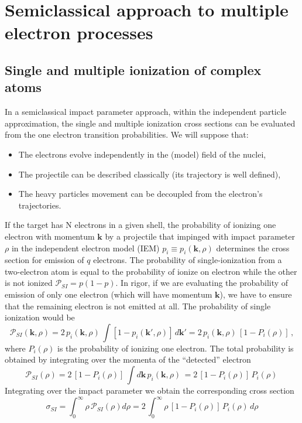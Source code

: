 \chapter{Semiclassical approach to multiple electron processes}
\label{C:Semic-appro-multi-elect-proce}

\section{Single and multiple ionization of complex atoms}
\label{S:Single-multipl-ionizat-complex-atoms}

In a semiclassical impact parameter approach, within the independent
particle approximation, the single and multiple ionization cross
sections can be evaluated from the one electron transition
probabilities. We will suppose that:
\begin{itemize}
\item The electrons evolve independently  in the (model) field of the
nuclei,
\item The projectile can be described classically (its trajectory is
well defined),
\item The  heavy particles movement can be decoupled from the electron's
  trajectories.
\end{itemize}

If the target has N electrons in a given shell, the probability of
ionizing one electron with momentum $\bm{k}$ by a projectile that
impinged with impact parameter $\rho$ in the independent electron model
(IEM) $p_{i} \equiv p_{i}(\bm{k},\rho) $ determines the cross section
for emission of $q$ electrons. The probability of single-ionization
from a two-electron atom is equal to the probability of ionize on
electron while the other is not ionized $\mathcal{P}_{SI} = p(1-p)$. In
rigor, if we are evaluating the probability of emission of only one
electron (which will have momentum $\bm{k}$), we have to ensure that
the remaining electron is not emitted at all. The probability of single
ionization would be
\begin{equation}\label{Q:SionPrb}
\mathcal{P}_{SI}(\bm{k},\rho) = 2\, p_{i}(\bm{k},\rho)\, \int \left[1 -
p_{i}(\bm{k}',\rho) \right] \, d \bm{k}' = 2\, p_{i}(\bm{k},\rho)\,
\left[1 - P_{i}(\rho) \right] \, ,
\end{equation}
where $P_{i}(\rho)$ is the probability of ionizing one electron. The
total probability is obtained by integrating over the momenta of the
``detected'' electron
\[
\mathcal{P}_{SI}(\rho) = 2 \, \left[ 1-P_{i}(\rho) \right] \, \int d
\bm{k} \, p_{i}(\bm{k},\rho)\, = 2 \, \left[ 1-P_{i}(\rho) \right] \,
P_{i}(\rho)\,
\]
Integrating over the impact parameter we obtain the corresponding cross
section
\[
\sigma_{SI} = \int_{0}^{\infty} \rho \,\mathcal{P}_{SI}(\rho) d \rho
= 2 \, \int_{0}^{\infty} \rho \,\left[ 1-P_{i}(\rho) \right] \,
P_{i}(\rho)\, d \rho
\]


